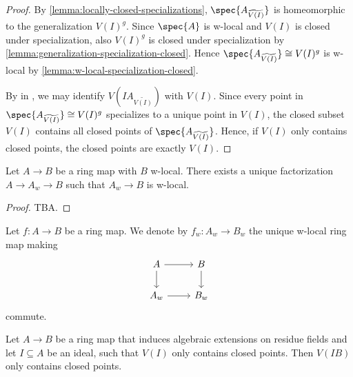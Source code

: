 \begin{proof}
    \leanok
    By \ref{lemma:locally-closed-specializations}, $\spec{A_{\widetilde{V(I)}}}$ is homeomorphic
    to the generalization $V(I)^g$. Since $\spec{A}$ is w-local and $V(I)$ is closed
    under specialization, also $V(I)^g$ is closed under specialization by
    \ref{lemma:generalization-specialization-closed}. Hence
    $\spec{A_{\widetilde{V(I)}}} \cong V(I)^g$ is w-local by \ref{lemma:w-local-specialization-closed}.

    By  in , we may identify $V(IA_{\widetilde{V(I)}})$ with
    $V(I)$.
    Since every point in
    $\spec{A_{\widetilde{V(I)}}} \cong V(I)^g$ specializes to a unique point in $V(I)$,
    the closed subset $V(I)$ contains all closed points of $\spec{A_{\widetilde{V(I)}}}$. Hence,
    if $V(I)$ only contains closed points, the closed points are exactly $V(I)$.
\end{proof}

\begin{proposition}
    Let $A \to B$ be a ring map with $B$ w-local. There exists a unique
    factorization $A \to A_w \to B$ such that $A_w \to B$ is w-local.
    \label{lemma:univ-prop-w-localization}
\end{proposition}

\begin{proof}
    TBA.
\end{proof}

\begin{definition}
    Let $f\colon A \to B$ be a ring map. We denote by $f_w\colon A_w \to B_w$ the
    unique w-local ring map making
    \[
    \begin{tikzcd}
        A \arrow{r} \arrow{d} & B \arrow{d} \\
        A_w \arrow{r} & B_w
    \end{tikzcd}
    \] commute.
    \label{def:w-localization-map}
\end{definition}

\begin{lemma}
    Let $A \to B$ be a ring map that induces algebraic extensions on residue fields
    and let $I \subseteq A$ be an ideal, such that $V(I)$ only contains closed points.
    Then $V(IB)$ only contains closed points.
    \label{lemma:preimage-closed-points-algebraic}
    \leanok
\end{lemma}

